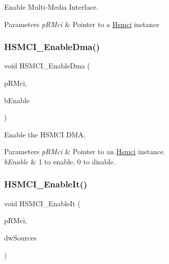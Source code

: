 Enable Multi-\/\+Media Interface. 


\begin{DoxyParams}{Parameters}
{\em p\+R\+Mci} & Pointer to a \mbox{\hyperlink{structHsmci}{Hsmci}} instance \\
\hline
\end{DoxyParams}
\mbox{\label{group__hsmci__functions_gaf2f9c4d2b276027b3c238530ed107308}} 
\subsubsection{\texorpdfstring{HSMCI\_EnableDma()}{HSMCI\_EnableDma()}}
{\footnotesize\ttfamily void H\+S\+M\+C\+I\+\_\+\+Enable\+Dma (\begin{DoxyParamCaption}\item[{\mbox{\hyperlink{structHsmci}{Hsmci}} $\ast$}]{p\+R\+Mci,  }\item[{uint8\+\_\+t}]{b\+Enable }\end{DoxyParamCaption})}



Enable the H\+S\+M\+CI D\+MA. 


\begin{DoxyParams}{Parameters}
{\em p\+R\+Mci} & Pointer to an \mbox{\hyperlink{structHsmci}{Hsmci}} instance. \\
\hline
{\em b\+Enable} & 1 to enable, 0 to disable. \\
\hline
\end{DoxyParams}
\mbox{\label{group__hsmci__functions_ga9b3811aee4fc3cef7fcc8b38ab0fa7f2}} 
\subsubsection{\texorpdfstring{HSMCI\_EnableIt()}{HSMCI\_EnableIt()}}
{\footnotesize\ttfamily void H\+S\+M\+C\+I\+\_\+\+Enable\+It (\begin{DoxyParamCaption}\item[{\mbox{\hyperlink{structHsmci}{Hsmci}} $\ast$}]{p\+R\+Mci,  }\item[{uint32\+\_\+t}]{dw\+Sources }\end{DoxyParamCaption})}



